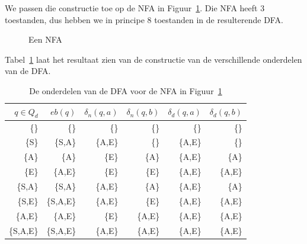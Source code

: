 We passen die constructie toe op de NFA in Figuur~\ref{fsa2}. Die NFA
heeft 3 toestanden, dus hebben we in principe 8 toestanden in de
resulterende DFA.

\clearpage

\begin{figure}[h]
\caption{Een NFA \label{fsa2}}
\end{figure}


Tabel~\ref{charstable} laat het resultaat zien van de constructie van
de verschillende onderdelen van de DFA. 


\begin{table}[ht]
\center
\begin{tabular}{|r|r|r|r|r|r|}
\hline
$q \in Q_d$    & $eb(q)$  &  $\delta_n(q,a) $ & $\delta_n(q,b) $ & $\delta_d(q,a)$ & $\delta_d(q,b)$ \\ \hline
\{\}           & \{\}     &  \{\}             & \{\}             & \{\}            & \{\}            \\
\{S\}          & \{S,A\}  &  \{A,E\}          & \{\}             & \{A,E\}         & \{\}            \\
\{A\}          & \{A\}    &  \{E\}            & \{A\}            & \{A,E\}         & \{A\}           \\
\{E\}          & \{A,E\}  &  \{E\}            & \{E\}            & \{A,E\}         & \{A,E\}         \\
\{S,A\}        & \{S,A\}  &  \{A,E\}          & \{A\}            & \{A,E\}         & \{A\}           \\
\{S,E\}        & \{S,A,E\}&  \{A,E\}          & \{E\}            & \{A,E\}         & \{A,E\}         \\
\{A,E\}        & \{A,E\}  &  \{E\}            & \{A,E\}          & \{A,E\}         & \{A,E\}         \\
\{S,A,E\}      & \{S,A,E\}&  \{A,E\}          & \{A,E\}          & \{A,E\}         & \{A,E\}         \\
\hline
\end{tabular}
\caption{De onderdelen van de DFA voor de NFA in Figuur~\ref{fsa2}} \label{charstable}
\end{table}


